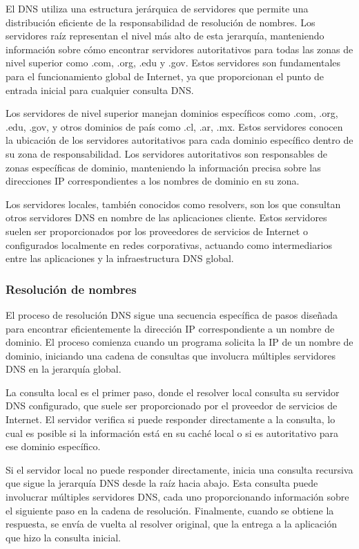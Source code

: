 El DNS utiliza una estructura jerárquica de servidores que permite una distribución eficiente de la responsabilidad de resolución de nombres. Los servidores raíz representan el nivel más alto de esta jerarquía, manteniendo información sobre cómo encontrar servidores autoritativos para todas las zonas de nivel superior como .com, .org, .edu y .gov. Estos servidores son fundamentales para el funcionamiento global de Internet, ya que proporcionan el punto de entrada inicial para cualquier consulta DNS.

Los servidores de nivel superior manejan dominios específicos como .com, .org, .edu, .gov, y otros dominios de país como .cl, .ar, .mx. Estos servidores conocen la ubicación de los servidores autoritativos para cada dominio específico dentro de su zona de responsabilidad. Los servidores autoritativos son responsables de zonas específicas de dominio, manteniendo la información precisa sobre las direcciones IP correspondientes a los nombres de dominio en su zona.

Los servidores locales, también conocidos como resolvers, son los que consultan otros servidores DNS en nombre de las aplicaciones cliente. Estos servidores suelen ser proporcionados por los proveedores de servicios de Internet o configurados localmente en redes corporativas, actuando como intermediarios entre las aplicaciones y la infraestructura DNS global.

\subsubsection{Resolución de nombres}

El proceso de resolución DNS sigue una secuencia específica de pasos diseñada para encontrar eficientemente la dirección IP correspondiente a un nombre de dominio. El proceso comienza cuando un programa solicita la IP de un nombre de dominio, iniciando una cadena de consultas que involucra múltiples servidores DNS en la jerarquía global.

La consulta local es el primer paso, donde el resolver local consulta su servidor DNS configurado, que suele ser proporcionado por el proveedor de servicios de Internet. El servidor verifica si puede responder directamente a la consulta, lo cual es posible si la información está en su caché local o si es autoritativo para ese dominio específico.

Si el servidor local no puede responder directamente, inicia una consulta recursiva que sigue la jerarquía DNS desde la raíz hacia abajo. Esta consulta puede involucrar múltiples servidores DNS, cada uno proporcionando información sobre el siguiente paso en la cadena de resolución. Finalmente, cuando se obtiene la respuesta, se envía de vuelta al resolver original, que la entrega a la aplicación que hizo la consulta inicial.

